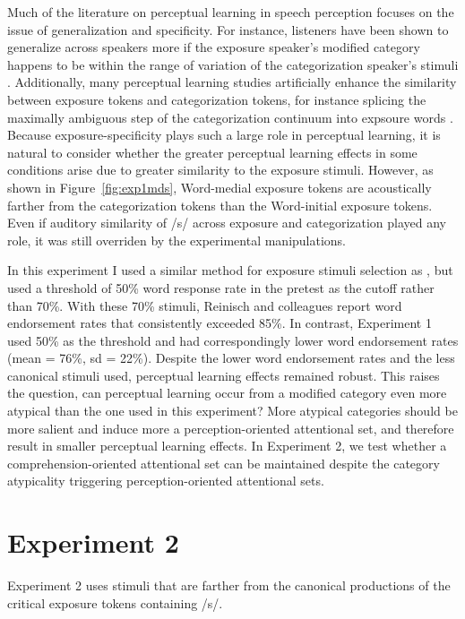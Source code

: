 Much of the literature on perceptual learning in speech perception focuses on the issue of generalization and specificity.
For instance, listeners have been shown to generalize across speakers more if the exposure speaker's modified category happens to be within the range of variation of the categorization speaker's stimuli \citep{Eisner2005,Kraljic2005}.
Additionally, many perceptual learning studies artificially enhance the similarity between exposure tokens and categorization tokens, for instance splicing the maximally ambiguous step of the categorization continuum into expsoure words \citep{Norris2003}.
Because exposure-specificity plays such a large role in perceptual learning, it is natural to consider whether the greater perceptual learning effects in some conditions arise due to greater similarity to the exposure stimuli.
However, as shown in Figure~\ref{fig:exp1mds}, Word-medial exposure tokens are acoustically farther from the categorization tokens than the Word-initial exposure tokens.  
Even if auditory similarity of /s/ across exposure and categorization played any role, it was still overriden by the experimental manipulations.

In this experiment I used a similar method for exposure stimuli selection as \citet{Reinisch2013}, but used a threshold of 50\% word response rate in the pretest as the cutoff rather than 70\%.
With these 70\% stimuli, Reinisch and colleagues report word endorsement rates that consistently exceeded 85\%.
In contrast, Experiment 1 used 50\% as the threshold and had correspondingly lower word endorsement rates (mean = 76\%, sd = 22\%).  
Despite the lower word endorsement rates and the less canonical stimuli used, perceptual learning effects remained robust.
This raises the question, can perceptual learning occur from a modified category even more atypical than the one used in this experiment?
More atypical categories should be more salient and induce more a perception-oriented attentional set, and therefore result in smaller perceptual learning effects.
In Experiment 2, we test whether a comprehension-oriented attentional set can be maintained despite the category atypicality triggering perception-oriented attentional sets.

\section{Experiment 2}

Experiment 2 uses stimuli that are farther from the canonical productions of the critical exposure tokens containing /s/.

